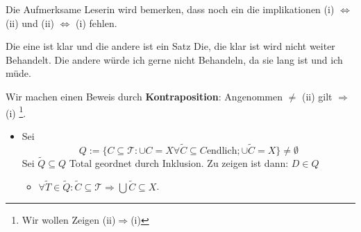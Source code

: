 Die Aufmerksame Leserin wird bemerken, dass noch ein die implikationen
(i) $\Leftrightarrow$ (ii) und (ii) $\Leftrightarrow$ (i) fehlen.

Die eine ist klar und die andere ist ein Satz
Die, die klar ist wird nicht weiter Behandelt.
Die andere würde ich gerne nicht Behandeln, da sie lang ist und ich müde.

{
Wir machen einen Beweis durch \textbf{Kontraposition}:
Angenommen $\neq$ (ii) gilt $\Rightarrow$ (i)
\footnote{Wir wollen Zeigen (ii)$\Rightarrow$(i)}.
\begin{itemize}
    \item[1.] Sei 
    $$
    Q:=\{C \subseteq \mathcal{T} : \cup C = X \forall \tilde{C}\subseteq C
     \text{endlich}; \cup \tilde{C} = X\} \neq \emptyset
    $$
    Sei $\tilde{Q} \subseteq Q$ Total geordnet durch Inklusion.
    Zu zeigen ist dann: $D \in Q$
    \begin{itemize}
        \item $\forall \tilde{T} \in \tilde{Q}: \tilde{C} \subseteq 
        \mathcal{T} \Rightarrow \bigcup \tilde{C} \subseteq X $.
    \end{itemize}
\end{itemize}
}